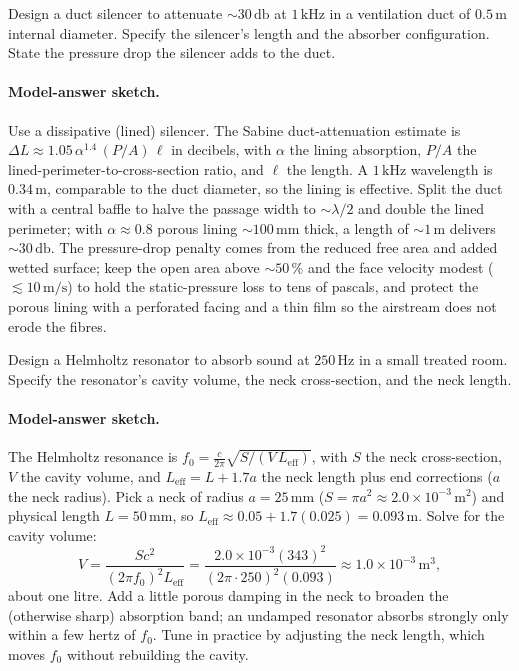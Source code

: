 \begin{exercise}
Design a duct silencer to attenuate $\sim 30\,\si{\decibel}$ at
$1\,\si{\kilo\hertz}$ in a ventilation duct of $0.5\,\si{\meter}$
internal diameter. Specify the silencer's length and the absorber
configuration. State the pressure drop the silencer adds to the
duct.
\paragraph{Model-answer sketch.} Use a dissipative (lined) silencer.
The Sabine duct-attenuation estimate is $\Delta L \approx 1.05\,
\alpha^{1.4}\,(P/A)\,\ell$ in decibels, with $\alpha$ the lining
absorption, $P/A$ the lined-perimeter-to-cross-section ratio, and
$\ell$ the length. A $1\,\si{\kilo\hertz}$ wavelength is
$0.34\,\si{\meter}$, comparable to the duct diameter, so the lining is
effective. Split the duct with a central baffle to halve the passage
width to $\sim\lambda/2$ and double the lined perimeter; with
$\alpha\approx 0.8$ porous lining $\sim 100\,\si{\milli\meter}$ thick,
a length of $\sim 1\,\si{\meter}$ delivers $\sim 30\,\si{\decibel}$.
The pressure-drop penalty comes from the reduced free area and added
wetted surface; keep the open area above $\sim 50\,\%$ and the face
velocity modest ($\lesssim 10\,\si{\meter\per\second}$) to hold the
static-pressure loss to tens of pascals, and protect the porous lining
with a perforated facing and a thin film so the airstream does not
erode the fibres.
\end{exercise}

\begin{exercise}
Design a Helmholtz resonator to absorb sound at $250\,\si{\hertz}$
in a small treated room. Specify the resonator's cavity volume, the
neck cross-section, and the neck length.
\paragraph{Model-answer sketch.} The Helmholtz resonance is
$f_0 = \frac{c}{2\pi}\sqrt{S/(V\,L_{\text{eff}})}$, with $S$ the neck
cross-section, $V$ the cavity volume, and $L_{\text{eff}} = L + 1.7a$
the neck length plus end corrections ($a$ the neck radius). Pick a neck
of radius $a = 25\,\si{\milli\meter}$ ($S = \pi a^2 \approx 2.0\times
10^{-3}\,\si{\meter\squared}$) and physical length $L = 50\,\si{
\milli\meter}$, so $L_{\text{eff}} \approx 0.05 + 1.7(0.025) =
0.093\,\si{\meter}$. Solve for the cavity volume:
\[
V = \frac{S c^2}{(2\pi f_0)^2 L_{\text{eff}}}
= \frac{2.0\times 10^{-3}(343)^2}{(2\pi\cdot 250)^2(0.093)}
\approx 1.0\times 10^{-3}\,\si{\meter\cubed},
\]
about one litre. Add a little porous damping in the neck to broaden
the (otherwise sharp) absorption band; an undamped resonator absorbs
strongly only within a few hertz of $f_0$. Tune in practice by
adjusting the neck length, which moves $f_0$ without rebuilding the
cavity.
\end{exercise}

